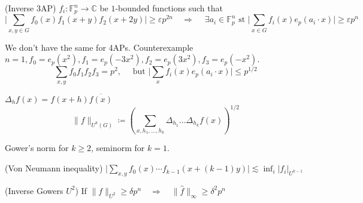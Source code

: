 \begin{theorem}(Inverse 3AP) $f_i : \mathbb{F}_p^{n} \to \mathbb{C}$ be $1$-bounded functions such that
\[
\lvert \sum_{x, y \in G} f_0(x) f_1(x+y)f_2(x+2y) \rvert \geq \varepsilon p^{2n} \quad  \Rightarrow \quad \ \exists a_i \in \mathbb{F}_p^{n} \text{ st }
\lvert \sum_{x \in G}f_i(x)e_p(a_i \cdot x) \rvert \geq  \varepsilon p^n
\]
\end{theorem}


\begin{proposition}
We don't have the same for 4APs. Counterexample $n=1, f_0 = e_p(x^2), f_1 = e_p(-3x^2), f_2 = e_p(3x^2), f_3 = e_p(-x^2)$.
\[
\sum_{x, y} f_0f_1f_2f_3 = p^2, \quad \text{ but } \lvert \sum_x f_i(x)e_p(a_i \cdot x) \rvert \leq p^{1/2}
\]
\end{proposition}

\begin{definition} $\Delta _h f(x) = f(x+h) \overline{f(x)}$
\[
\lVert f \rVert_{U^k(G)} \coloneqq \left( \sum_{x, h_1, \ldots, h_k} \Delta_{h_1} \ldots \Delta _{h_k}f(x) \right) ^{1/2}
\]    
\end{definition}

\begin{proposition} Gower's norm for $k \geq 2$, seminorm for $k = 1$.
\end{proposition}

\begin{proposition}(Von Neumann inequality)
$\lvert \sum_{x, y} f_0(x) \cdots f_{k-1}(x + (k-1)y) \rvert \lesssim  \inf _{i} \lvert f_i \rvert _{U^{k-1}}  $
\end{proposition}

\begin{theorem}(Inverse Gowers $U^2$) If $\lVert f \rVert_{U^{2}} \geq \delta p^n  \quad  \Rightarrow  \quad  \lVert \hat{f} \rVert _{\infty} \geq \delta ^2 p^n$
\end{theorem}


